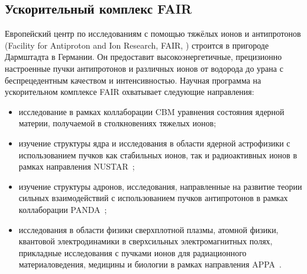 \subsection{Ускорительный комплекс FAIR}\label{sec:secFAIR}




Европейский центр по исследованиям с помощью тяжёлых ионов и антипротонов (Facility for Antiproton and Ion Research, FAIR, \cite{FAIR}) строится в пригороде Дармштадта в Германии.
Он предоставит высокоэнергетичные, прецизионно настроенные пучки антипротонов и различных ионов от водорода до урана с беспрецедентным качеством и интенсивностью.
Научная программа на ускорительном комплексе FAIR охватывает следующие направления:
\begin{itemize}
\item исследование в рамках коллаборации CBM уравнения состояния ядерной материи, получаемой в столкновениях тяжелых ионов;
\item изучение структуры ядра и исследования в области ядерной астрофизики с использованием пучков как стабильных ионов, так и радиоактивных ионов в рамках направления NUSTAR~\cite{NUSTAR};
\item изучение структуры адронов, исследования, направленные на развитие теории сильных взаимодействий с использованием пучков антипротонов в рамках коллаборации PANDA~\cite{PANDA};
\item исследования в области физики сверхплотной плазмы, атомной физики, квантовой электродинамики в сверхсильных электромагнитных полях, прикладные исследования с пучками ионов для радиационного материаловедения, медицины и биологии в рамках направления APPA~\cite{APPA}.
\end{itemize}


